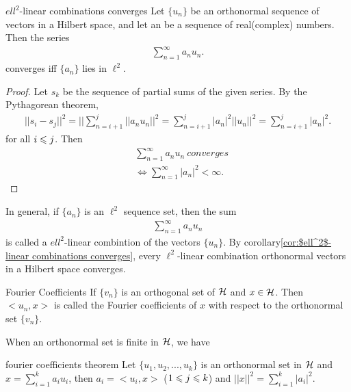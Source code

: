 \begin{corollary}{}{$ell^2$-linear combinations converges}
    Let $\{u_n\}$ be an orthonormal sequence of vectors in a Hilbert space, and let {an}
    be a sequence of real(complex) numbers. Then the series 
    \begin{align*}
        \sum\limits_{n=1}^{\infty} a_nu_n.
    \end{align*}
    converges iff $\{a_n\}$ lies in $\ell^2$.
\end{corollary}

\begin{proof}
    Let $s_k$ be the sequence of partial sums of the given series. By the Pythagorean theorem, 
    \begin{align*}
        ||s_i-s_j||^2 = ||\sum\limits_{n=i+1}^{j}||a_nu_n||^2 = \sum\limits_{n=i+1}^{j}|a_n|^2||u_n||^2= \sum\limits_{n=i+1}^{j}|a_n|^2.
    \end{align*}
    for all $i\leqslant j$. Then
    \begin{align*}
        & \sum\limits_{n=1}^{\infty} a_nu_n\ converges\\
        & \Leftrightarrow \sum\limits_{n=1}^{\infty} |a_n|^2<\infty.
    \end{align*}
\end{proof}

In general, if $\{a_n\}$ is an $\ell^2$ sequence set, then the sum
\begin{align*}
    \sum\limits_{n=1}^{\infty} a_nu_n
\end{align*}
is called a $ell^2$-linear combintion of the vectors $\{u_n\}$. By corollary\ref{cor:$ell^2$-linear combinations converges}, 
every $\ell^2$-linear combination orthonormal vectors in a Hilbert space converges.

\begin{definition}{Fourier Coefficients}{}
    If $\{v_n\}$ is an orthogonal set of $\mathcal{H}$ and $x\in \mathcal{H}$. 
    Then $<u_n,x>$ is called the Fourier coefficients of $x$ 
    with respect to the orthonormal set $\{v_n\}$.
\end{definition}

When an orthonormal set is finite in $\mathcal{H}$, we have

\begin{theorem}{}{fourier coefficients theorem}
    Let $\{u_1,u_2,...,u_k\}$ is an orthonormal set in $\mathcal{H}$ and $x=\sum\limits_{i=1}^{k}a_iu_i$, then $a_i=<u_i,x>$ ($1\leqslant j\leqslant k$) and
    $||x||^2=\sum\limits_{i=1}^{k}|a_i|^2$. 
\end{theorem}

